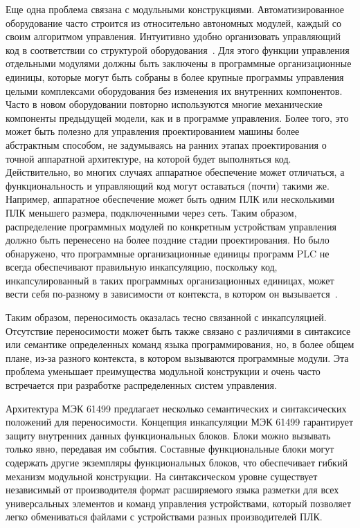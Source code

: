 Еще одна проблема связана с модульными конструкциями. Автоматизированное оборудование часто строится из относительно автономных модулей, каждый со своим алгоритмом управления. Интуитивно удобно организовать управляющий код в соответствии со структурой оборудования~\cite{holm2012iec}. Для этого функции управления отдельными модулями должны быть заключены в программные организационные единицы, которые могут быть собраны в более крупные программы управления целыми комплексами оборудования без изменения их внутренних компонентов. Часто в новом оборудовании повторно используются многие механические компоненты предыдущей модели, как и в программе управления. Более того, это может быть полезно для управления проектированием машины более абстрактным способом, не задумываясь на ранних этапах проектирования о точной аппаратной архитектуре, на которой будет выполняться код. Действительно, во многих случаях аппаратное обеспечение может отличаться, а функциональность и управляющий код могут оставаться (почти) такими же. Например, аппаратное обеспечение может быть одним ПЛК или несколькими ПЛК меньшего размера, подключенными через сеть. Таким образом, распределение программных модулей по конкретным устройствам управления должно быть перенесено на более поздние стадии проектирования. Но было обнаружено, что программные организационные единицы программ PLC не всегда обеспечивают правильную инкапсуляцию, поскольку код, инкапсулированный в таких программных организационных единицах, может вести себя по-разному в зависимости от контекста, в котором он вызывается~\cite{tangermann2004encapsulation}.

Таким образом, переносимость оказалась тесно связанной с инкапсуляцией. Отсутствие переносимости может быть также связано с различиями в синтаксисе или семантике определенных команд языка программирования, но, в более общем плане, из-за разного контекста, в котором вызываются программные модули. Эта проблема уменьшает преимущества модульной конструкции и очень часто встречается при разработке распределенных систем управления.

Архитектура МЭК 61499 предлагает несколько семантических и синтаксических положений для переносимости. Концепция инкапсуляции МЭК 61499 гарантирует защиту внутренних данных функциональных блоков. Блоки можно вызывать только явно, передавая им события. Составные функциональные блоки могут содержать другие экземпляры функциональных блоков, что обеспечивает гибкий механизм модульной конструкции. На синтаксическом уровне существует независимый от производителя формат расширяемого языка разметки для всех универсальных элементов и команд управления устройствами, который позволяет легко обмениваться файлами с устройствами разных производителей ПЛК.

